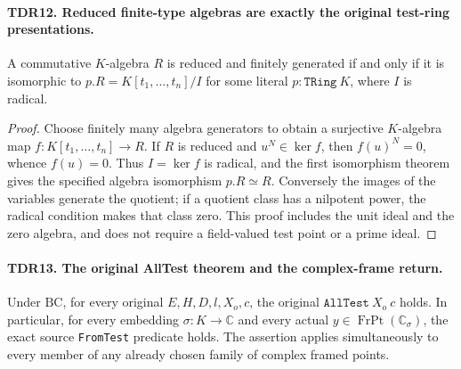 \paragraph{TDR12. Reduced finite-type algebras are exactly the original test-ring presentations.}
\label{claim:TDR12}
A commutative \(K\)-algebra \(R\) is reduced and finitely
generated if and only if it is isomorphic to
\(p.R=K[t_1,\ldots,t_n]/I\) for some literal
\(p:\texttt{TRing}\ K\), where \(I\) is radical.

\begin{proof}
Choose finitely many algebra generators to obtain a surjective
\(K\)-algebra map \(f:K[t_1,\ldots,t_n]\to R\).
If \(R\) is reduced and \(u^N\in\ker f\), then
\(f(u)^N=0\), whence \(f(u)=0\).  Thus \(I=\ker f\)
is radical, and the first isomorphism theorem gives the specified
algebra isomorphism \(p.R\simeq R\).  Conversely the images
of the variables generate the quotient; if a quotient class has
a nilpotent power, the radical condition makes that class zero.
This proof includes the unit ideal and the zero algebra, and
does not require a field-valued test point or a prime ideal.
\end{proof}

\paragraph{TDR13. The original AllTest theorem and the complex-frame return.}
\label{claim:TDR13}
Under \(\mathrm{BC}\), for every original \(E,H,D,l,X_o,c\),
the original \(\texttt{AllTest}\ X_o\ c\) holds.  In
particular, for every embedding \(\sigma:K\to\mathbb C\)
and every actual \(y\in\operatorname{FrPt}(\mathbb C_\sigma)\),
the exact source \texttt{FromTest} predicate holds.
The assertion applies simultaneously to every member of any
already chosen family of complex framed points.

